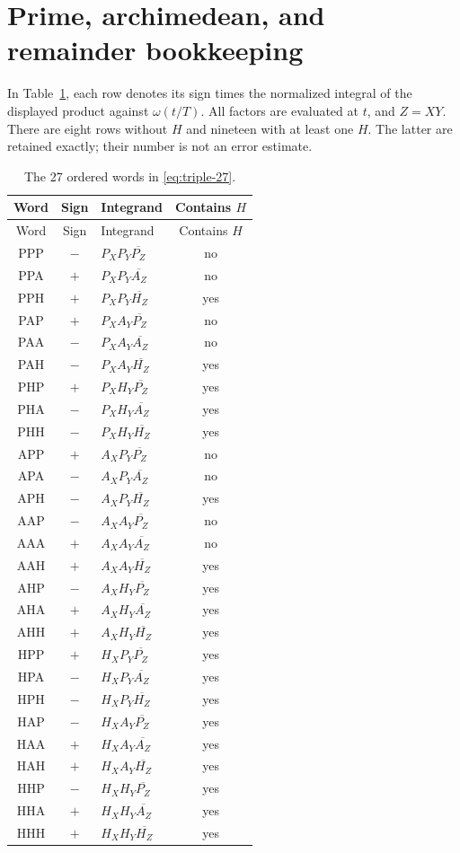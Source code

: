 \documentclass[11pt]{article}
\begin{document}
\section{Prime, archimedean, and remainder bookkeeping}

In Table~\ref{tab:words}, each row denotes its sign times the normalized
integral of the displayed product against \(\omega(t/T)\).
All factors are evaluated at \(t\), and \(Z=XY\).
There are eight rows without \(H\) and nineteen with at least one \(H\).
The latter are retained exactly; their number is not an error estimate.

\begin{longtable}{cclc}
\caption{The 27 ordered words in \eqref{eq:triple-27}.}\label{tab:words}\\
\toprule Word & Sign & Integrand & Contains \(H\)\\\midrule
\endfirsthead
\toprule Word & Sign & Integrand & Contains \(H\)\\\midrule
\endhead
\bottomrule\endfoot
PPP & $-$ & $P_XP_Y\overline{P_Z}$ & no\\
PPA & $+$ & $P_XP_Y\overline{A_Z}$ & no\\
PPH & $+$ & $P_XP_Y\overline{H_Z}$ & yes\\
PAP & $+$ & $P_XA_Y\overline{P_Z}$ & no\\
PAA & $-$ & $P_XA_Y\overline{A_Z}$ & no\\
PAH & $-$ & $P_XA_Y\overline{H_Z}$ & yes\\
PHP & $+$ & $P_XH_Y\overline{P_Z}$ & yes\\
PHA & $-$ & $P_XH_Y\overline{A_Z}$ & yes\\
PHH & $-$ & $P_XH_Y\overline{H_Z}$ & yes\\
APP & $+$ & $A_XP_Y\overline{P_Z}$ & no\\
APA & $-$ & $A_XP_Y\overline{A_Z}$ & no\\
APH & $-$ & $A_XP_Y\overline{H_Z}$ & yes\\
AAP & $-$ & $A_XA_Y\overline{P_Z}$ & no\\
AAA & $+$ & $A_XA_Y\overline{A_Z}$ & no\\
AAH & $+$ & $A_XA_Y\overline{H_Z}$ & yes\\
AHP & $-$ & $A_XH_Y\overline{P_Z}$ & yes\\
AHA & $+$ & $A_XH_Y\overline{A_Z}$ & yes\\
AHH & $+$ & $A_XH_Y\overline{H_Z}$ & yes\\
HPP & $+$ & $H_XP_Y\overline{P_Z}$ & yes\\
HPA & $-$ & $H_XP_Y\overline{A_Z}$ & yes\\
HPH & $-$ & $H_XP_Y\overline{H_Z}$ & yes\\
HAP & $-$ & $H_XA_Y\overline{P_Z}$ & yes\\
HAA & $+$ & $H_XA_Y\overline{A_Z}$ & yes\\
HAH & $+$ & $H_XA_Y\overline{H_Z}$ & yes\\
HHP & $-$ & $H_XH_Y\overline{P_Z}$ & yes\\
HHA & $+$ & $H_XH_Y\overline{A_Z}$ & yes\\
HHH & $+$ & $H_XH_Y\overline{H_Z}$ & yes\\
\end{longtable}
\end{document}
